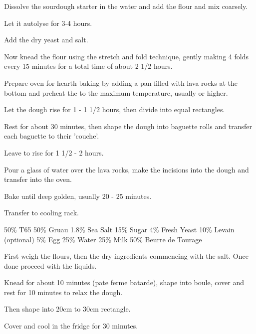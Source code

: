 \begin{method}
Dissolve the sourdough starter in the water and add the flour and mix coarsely.

Let it autolyse for 3-4 hours.

Add the dry yeast and salt.

Now knead the flour using the stretch and fold technique, gently making 4 folds  every 15 minutes for a total time of about 2 1/2 hours.

Prepare oven for hearth baking by adding a pan filled with lava rocks at the bottom and preheat the to the maximum temperature, usually  or higher.

Let the dough rise for 1 - 1 1/2 hours, then divide into equal rectangles.

Rest for about 30 minutes, then shape the dough into baguette rolls and transfer each baguette to their 'couche'.

Leave to rise for 1 1/2 - 2 hours.

Pour a glass of water over the lava rocks, make the incisions into the dough and transfer into the oven.

Bake until deep golden,  usually 20 - 25 minutes.

Transfer to cooling rack.

\end {method}

\label{rec:baking-plf}

\begin{ingreds}
	50\% T65
	50\% Gruau
	1.8\% Sea Salt
	15\% Sugar
	4\% Fresh Yeast
	10\% Levain (optional)
	5\% Egg
	25\% Water
	25\% Milk
	50\% Beurre de Tourage
\end{ingreds}

\begin{method}[]

First weigh the flours, then the dry ingredients commencing with the salt.
Once done proceed with the liquids.

Knead for about 10 minutes (pate ferme batarde), shape into boule, cover and 
rest for 10 minutes to relax the dough.

Then shape into 20cm to 30cm rectangle.

Cover and cool in the fridge for 30 minutes.
\end {method}

